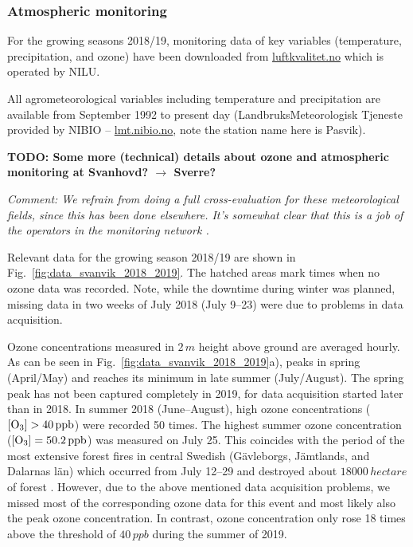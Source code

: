 \documentclass[bg, manuscript]{copernicus}
\begin{document}
\subsubsection{Atmospheric monitoring}
\label{subsubsec:atmo_svanvik}
For the growing seasons 2018/19, monitoring data of key variables (temperature, precipitation, and ozone) have been downloaded from \href{luftkvalitet.no}{luftkvalitet.no} which is operated by NILU.

All agrometeorological variables including temperature and precipitation are available from September 1992 to present day (LandbruksMeteorologisk Tjeneste provided by NIBIO -- \href{https://lmt.nibio.no/}{lmt.nibio.no}, note the station name here is Pasvik).

{\bf TODO: Some more (technical) details about ozone and atmospheric monitoring at Svanhovd? $\rightarrow$ Sverre?}

\emph{Comment: We refrain from doing a full cross-evaluation for these meteorological fields, since this has been done elsewhere. It's somewhat clear that this is a job of the operators in the monitoring network \citep{MetNOR2019}.}

Relevant data for the growing season 2018/19 are shown in Fig.~\ref{fig:data_svanvik_2018_2019}. The hatched areas mark times when no ozone data was recorded. Note, while the downtime during winter was planned, missing data in two weeks of July 2018 (July 9--23) were due to problems in data acquisition.

Ozone concentrations \chem{[O_3]} measured in $2\,\unit{m}$ height above ground are averaged hourly. As can be seen in Fig.~\ref{fig:data_svanvik_2018_2019}a), \chem{[O_3]} peaks in spring (April/May) and reaches its minimum in late summer (July/August). The spring peak has not been captured completely in 2019, for data acquisition started later than in 2018. In summer 2018 (June--August), high ozone concentrations ($\chem{[O_3]} > 40\,\unit{ppb}$) were recorded 50 times. The highest summer ozone concentration ($\chem{[O_3]} = 50.2\,\unit{ppb}$) was measured on July 25. This coincides with the period of the most extensive forest fires in central Swedish (G\"{a}vleborgs, J\"{a}mtlands, and Dalarnas l\"{a}n) which occurred from July 12--29 and destroyed about $18000\,\unit{hectare}$ of forest \citep{SOU2019}. However, due to the above mentioned data acquisition problems, we missed most of the corresponding ozone data for this event and most likely also the peak ozone concentration. In contrast, ozone concentration only rose 18 times above the threshold of $40\,\unit{ppb}$ during the summer of 2019.
\end{document}
